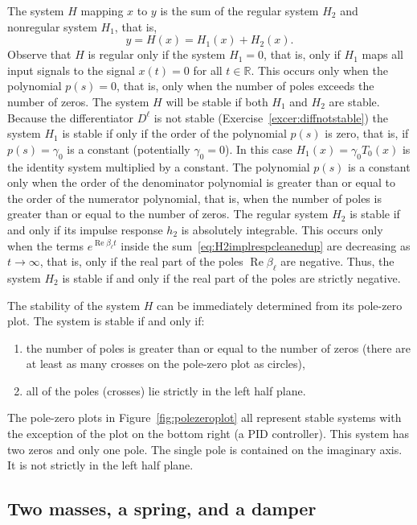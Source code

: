 \documentclass[11pt,a4paper]{book}
\theoremstyle{plain}
\numberwithin{equation}{section}
\newcommand{\reals}{{\mathbb R}}
\renewcommand{\Re}{\operatorname{Re}}
\begin{document}
The system $H$ mapping $x$ to $y$ is the sum of the regular system $H_2$ and nonregular system $H_1$, that is,
\[
y = H(x) = H_1(x) + H_2(x).
\] 
Observe that $H$ is regular only if the system $H_1 = 0$, that is, only if $H_1$ maps all input signals to the signal $x(t) = 0$ for all $t \in \reals$.  This occurs only when the polynomial $p(s) = 0$, that is, only when the number of poles exceeds the number of zeros.  The system $H$ will be stable if both $H_1$ and $H_2$ are stable.  Because the differentiator $D^\ell$ is not stable (Exercise~\ref{excer:diffnotstable}) the system $H_1$ is stable if only if the order of the polynomial $p(s)$ is zero, that is, if $p(s) = \gamma_0$ is a constant (potentially $\gamma_0 = 0$).  In this case $H_1(x) = \gamma_0 T_0(x)$ is the identity system multiplied by a constant.  The polynomial $p(s)$ is a constant only when the order of the denominator polynomial is greater than or equal to the order of the numerator polynomial, that is, when the number of poles is greater than or equal to the number of zeros.  The regular system $H_2$ is stable if and only if its impulse response $h_2$ is absolutely integrable.  This occurs only when the terms $e^{\Re{\beta_\ell} t}$ inside the sum~\eqref{eq:H2implrespcleanedup} are decreasing as $t \rightarrow \infty$, that is, only if the real part of the poles $\Re{\beta_\ell}$ are negative.  Thus, the system $H_2$ is stable if and only if the real part of the poles are strictly negative.

The stability of the system $H$ can be immediately determined from its pole-zero plot.  The system is stable if and only if: 
\begin{enumerate}
\item the number of poles is greater than or equal to the number of zeros (there are at least as many crosses on the pole-zero plot as circles), 
\item all of the poles (crosses) lie strictly in the left half plane.  
\end{enumerate}
The pole-zero plots in Figure~\ref{fig:polezeroplot} all represent stable systems with the exception of the plot on the bottom right (a PID controller).  This system has two zeros and only one pole.  The single pole is contained on the imaginary axis.  It is not strictly in the left half plane. 


\subsection{Two masses, a spring, and a damper}
\end{document}
